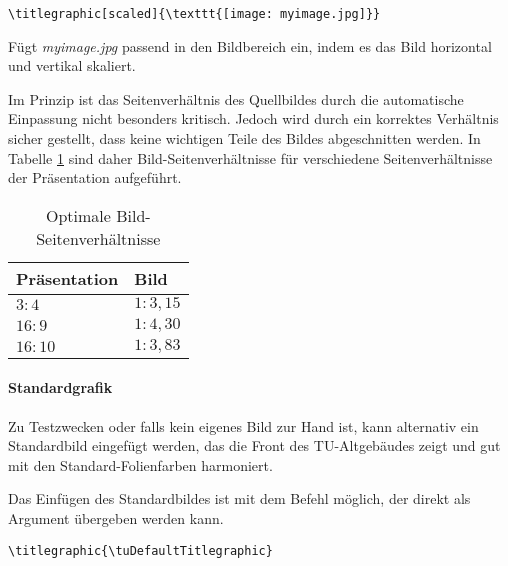\begin{example}
  \begin{lstlisting}
\titlegraphic[scaled]{\texttt{[image: myimage.jpg]}}
  \end{lstlisting}
  Fügt \textit{myimage.jpg} passend in den Bildbereich ein, indem es das Bild
  horizontal und vertikal skaliert.
\end{example}

Im Prinzip ist das Seitenverhältnis des Quellbildes durch die automatische
Einpassung nicht besonders kritisch. Jedoch wird durch ein korrektes Verhältnis
sicher gestellt, dass keine wichtigen Teile des Bildes abgeschnitten werden.
In Tabelle \ref{tbl:picratio} sind daher Bild-Seiten\-verhältnisse für
verschiedene Seitenverhältnisse der Präsentation aufgeführt.

\begin{table}[ht]
\centering
\begin{tabular}{ll}
\bfseries Präsentation  & \bfseries  Bild  \\
\midrule
$3:4$   & $1:3{,}15$ \\
$16:9$  & $1:4{,}30$ \\
$16:10$ & $1:3{,}83$ \\
\end{tabular}
\caption{Optimale Bild-Seitenverhältnisse}
\label{tbl:picratio}
\end{table}



\paragraph{Standardgrafik}

Zu Testzwecken oder falls kein eigenes Bild zur Hand ist,
kann alternativ ein Standardbild eingefügt werden, das die Front
des TU-Altgebäudes zeigt und gut mit den Standard-Folienfarben harmoniert.

Das Einfügen des Standardbildes ist mit dem Befehl
\linebreak{} möglich,
der  direkt als Argument übergeben werden kann.

\begin{example}
\begin{lstlisting}
\titlegraphic{\tuDefaultTitlegraphic}
\end{lstlisting}
\end{example}


